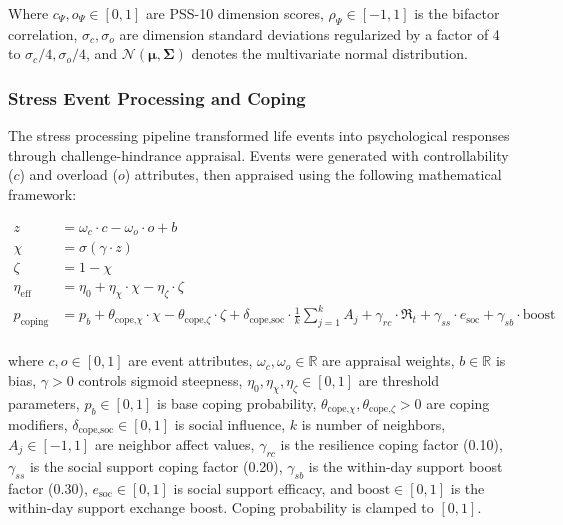 \documentclass[
  letterpaper,
  DIV=11,
  numbers=noendperiod]{scrartcl}
\begin{document}
Where \(c_\Psi, o_\Psi \in [0,1]\) are PSS-10 dimension scores,
\(\rho_\Psi \in [-1,1]\) is the bifactor correlation,
\(\sigma_c, \sigma_o\) are dimension standard deviations regularized by
a factor of 4 to \(\sigma_c/4, \sigma_o/4\), and
\(\mathcal{N}(\boldsymbol{\mu}, \boldsymbol{\Sigma})\) denotes the
multivariate normal distribution.

\subsubsection{Stress Event Processing and
Coping}\label{stress-event-processing-and-coping}

The stress processing pipeline transformed life events into
psychological responses through challenge-hindrance appraisal. Events
were generated with controllability (\(c\)) and overload (\(o\))
attributes, then appraised using the following mathematical framework:

\begin{align}
z &= \omega_c \cdot c - \omega_o \cdot o + b \\
\chi &= \sigma(\gamma \cdot z) \\
\zeta &= 1 - \chi \\
\eta_{\mathrm{eff}} &= \eta_{\text{0}} + \eta_{\chi} \cdot \chi - \eta_{\zeta} \cdot \zeta \\
p_{\mathrm{coping}} &= p_b + \theta_{\text{cope,}\chi} \cdot \chi - \theta_{\text{cope,}\zeta} \cdot \zeta + \delta_{\text{cope,soc}} \cdot \frac{1}{k} \sum_{j=1}^k A_j + \gamma_{rc} \cdot \mathfrak{R}_t + \gamma_{ss} \cdot e_{\mathrm{soc}} + \gamma_{sb} \cdot \mathrm{boost} \\
\label{eq-stress-processing}
\end{align}

where \(c, o \in [0,1]\) are event attributes,
\(\omega_c, \omega_o \in \mathbb{R}\) are appraisal weights,
\(b \in \mathbb{R}\) is bias, \(\gamma > 0\) controls sigmoid steepness,
\(\eta_{\text{0}}, \eta_{\chi}, \eta_{\zeta} \in [0,1]\) are threshold
parameters, \(p_b \in [0,1]\) is base coping probability,
\(\theta_{\text{cope,}\chi}, \theta_{\text{cope,}\zeta} > 0\) are coping
modifiers, \(\delta_{\text{cope,soc}} \in [0,1]\) is social influence,
\(k\) is number of neighbors, \(A_j \in [-1,1]\) are neighbor affect
values, \(\gamma_{rc}\) is the resilience coping factor (0.10),
\(\gamma_{ss}\) is the social support coping factor (0.20),
\(\gamma_{sb}\) is the within-day support boost factor (0.30),
\(e_{\mathrm{soc}} \in [0,1]\) is social support efficacy, and
\(\mathrm{boost} \in [0,1]\) is the within-day support exchange boost.
Coping probability is clamped to \([0,1]\).
\end{document}
